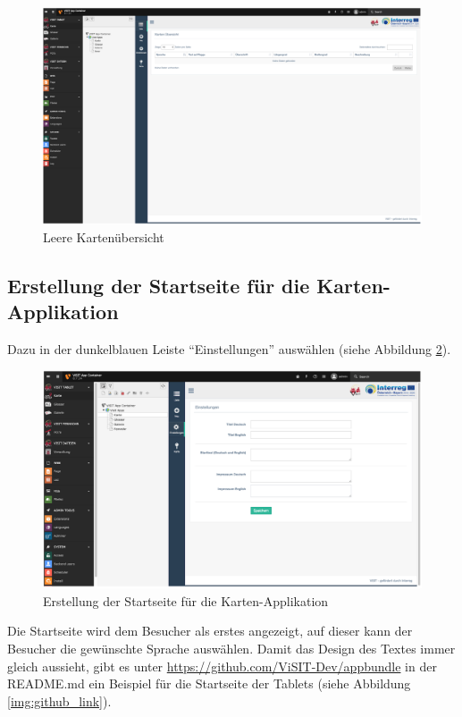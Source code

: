 \begin{figure}[ht!]
\centering
\includegraphics[width=12cm]{Figures/paula/karte/kartenapp.png}
\caption{Leere Kartenübersicht}
\label{img:kartenapp}
\end{figure}

\subsection{Erstellung der Startseite für die Karten-Applikation}

Dazu in der dunkelblauen Leiste “Einstellungen” auswählen (siehe Abbildung \ref{img:startseite_karte}).

\begin{figure}[ht!]
\centering
\includegraphics[width=12cm]{Figures/paula/karte/startseite_karte.png}
\caption{Erstellung der Startseite für die Karten-Applikation}
\label{img:startseite_karte}
\end{figure}

Die Startseite wird dem Besucher als erstes angezeigt, auf dieser kann der Besucher die gewünschte Sprache auswählen. Damit das Design des Textes immer gleich aussieht, gibt es unter \url{https://github.com/ViSIT-Dev/appbundle} in der README.md ein Beispiel für die Startseite der Tablets (siehe Abbildung \ref{img:github_link}).

